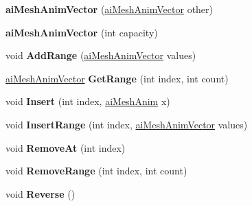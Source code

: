 \begin{DoxyCompactItemize}
\item 
\hypertarget{classai_mesh_anim_vector_aded994bbb1fb34dae87c7ed88509ff10}{{\bfseries ai\+Mesh\+Anim\+Vector} (\hyperlink{classai_mesh_anim_vector}{ai\+Mesh\+Anim\+Vector} other)}\label{classai_mesh_anim_vector_aded994bbb1fb34dae87c7ed88509ff10}

\item 
\hypertarget{classai_mesh_anim_vector_abd80334ed8c5ab4c013142e5af8f67ef}{{\bfseries ai\+Mesh\+Anim\+Vector} (int capacity)}\label{classai_mesh_anim_vector_abd80334ed8c5ab4c013142e5af8f67ef}

\item 
\hypertarget{classai_mesh_anim_vector_a9a31c3d24dce307735facc3206ce635e}{void {\bfseries Add\+Range} (\hyperlink{classai_mesh_anim_vector}{ai\+Mesh\+Anim\+Vector} values)}\label{classai_mesh_anim_vector_a9a31c3d24dce307735facc3206ce635e}

\item 
\hypertarget{classai_mesh_anim_vector_a5e5ccfcff6303e883cb5f37ed45bdd46}{\hyperlink{classai_mesh_anim_vector}{ai\+Mesh\+Anim\+Vector} {\bfseries Get\+Range} (int index, int count)}\label{classai_mesh_anim_vector_a5e5ccfcff6303e883cb5f37ed45bdd46}

\item 
\hypertarget{classai_mesh_anim_vector_a9ff4474784456b6bb297f4afc4a65e2c}{void {\bfseries Insert} (int index, \hyperlink{structai_mesh_anim}{ai\+Mesh\+Anim} x)}\label{classai_mesh_anim_vector_a9ff4474784456b6bb297f4afc4a65e2c}

\item 
\hypertarget{classai_mesh_anim_vector_a1f7aa7b37ee94b675bafb209fa7952b7}{void {\bfseries Insert\+Range} (int index, \hyperlink{classai_mesh_anim_vector}{ai\+Mesh\+Anim\+Vector} values)}\label{classai_mesh_anim_vector_a1f7aa7b37ee94b675bafb209fa7952b7}

\item 
\hypertarget{classai_mesh_anim_vector_a0819d6fa2f48b83634c41653fcdab8a8}{void {\bfseries Remove\+At} (int index)}\label{classai_mesh_anim_vector_a0819d6fa2f48b83634c41653fcdab8a8}

\item 
\hypertarget{classai_mesh_anim_vector_ae2fbb5822da8360429304138272b6027}{void {\bfseries Remove\+Range} (int index, int count)}\label{classai_mesh_anim_vector_ae2fbb5822da8360429304138272b6027}

\item 
\hypertarget{classai_mesh_anim_vector_a765cbd6b2a955ac48d5e7bea171a0242}{void {\bfseries Reverse} ()}\label{classai_mesh_anim_vector_a765cbd6b2a955ac48d5e7bea171a0242}


\end{DoxyCompactItemize}
